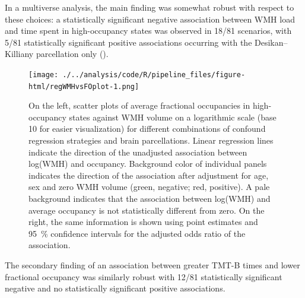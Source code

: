 In a multiverse analysis, the main finding was somewhat robust with respect to these choices: a statistically significant negative association between WMH load and time spent in high-occupancy states was observed in 18/81 scenarios, with 5/81 statistically significant positive associations occurring with the Desikan--Killiany parcellation only ().

\begin{figure}
    \texttt{[image: ./../analysis/code/R/pipeline\_files/figure-html/regWMHvsFOplot-1.png]}
    \caption{On the left, scatter plots of average fractional occupancies in high-occupancy states against WMH volume on a logarithmic scale (base 10 for easier visualization) for different combinations of confound regression strategies and brain parcellations. Linear regression lines indicate the direction of the unadjusted association between log(WMH) and occupancy. Background color of individual panels indicates the direction of the association after adjustment for age, sex and zero WMH volume (green, negative; red, positive). A pale background indicates that the association between log(WMH) and average occupancy is not statistically different from zero. On the right, the same information is shown using point estimates and \qty{95}{\percent} confidence intervals for the adjusted odds ratio of the association.}
    \label{fig:refWMHvsFO}
\end{figure}

The secondary finding of an association between greater TMT-B times and lower fractional occupancy was similarly robust with 12/81 statistically significant negative and no statistically significant positive associations.
